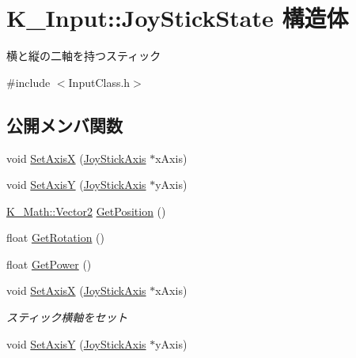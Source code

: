 \hypertarget{struct_k___input_1_1_joy_stick_state}{}\section{K\+\_\+\+Input\+:\+:Joy\+Stick\+State 構造体}
\label{struct_k___input_1_1_joy_stick_state}


横と縦の二軸を持つスティック  




{\ttfamily \#include $<$Input\+Class.\+h$>$}

\subsection*{公開メンバ関数}
\begin{DoxyCompactItemize}
\item 
void \mbox{\hyperlink{struct_k___input_1_1_joy_stick_state_a83ab767ff3a8f0c41cb5f999efc5042b}{Set\+AxisX}} (\mbox{\hyperlink{struct_k___input_1_1_joy_stick_axis}{Joy\+Stick\+Axis}} $\ast$x\+Axis)
\item 
void \mbox{\hyperlink{struct_k___input_1_1_joy_stick_state_a6dbdfeb0bf0f40a1176160a24f19e4b3}{Set\+AxisY}} (\mbox{\hyperlink{struct_k___input_1_1_joy_stick_axis}{Joy\+Stick\+Axis}} $\ast$y\+Axis)
\item 
\mbox{\hyperlink{namespace_k___math_a41eb0c2c69c938cd59989eb3241cefb2}{K\+\_\+\+Math\+::\+Vector2}} \mbox{\hyperlink{struct_k___input_1_1_joy_stick_state_a44183af6048028d62d2ad2e1ba48e060}{Get\+Position}} ()
\item 
float \mbox{\hyperlink{struct_k___input_1_1_joy_stick_state_a86a14421540711ba760f607adc2e73ca}{Get\+Rotation}} ()
\item 
float \mbox{\hyperlink{struct_k___input_1_1_joy_stick_state_a776fba0de2ecbfdec3636e857131d72e}{Get\+Power}} ()
\item 
void \mbox{\hyperlink{struct_k___input_1_1_joy_stick_state_a83ab767ff3a8f0c41cb5f999efc5042b}{Set\+AxisX}} (\mbox{\hyperlink{struct_k___input_1_1_joy_stick_axis}{Joy\+Stick\+Axis}} $\ast$x\+Axis)
\begin{DoxyCompactList}\small\item\em スティック横軸をセット \end{DoxyCompactList}\item 
void \mbox{\hyperlink{struct_k___input_1_1_joy_stick_state_a6dbdfeb0bf0f40a1176160a24f19e4b3}{Set\+AxisY}} (\mbox{\hyperlink{struct_k___input_1_1_joy_stick_axis}{Joy\+Stick\+Axis}} $\ast$y\+Axis)

\end{DoxyCompactItemize}
